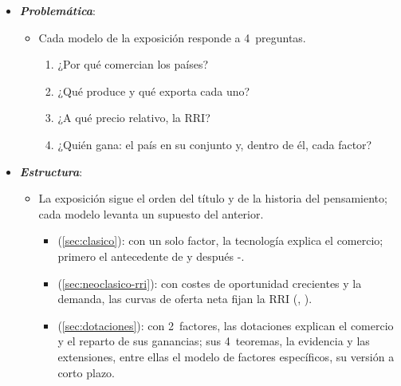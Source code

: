 \documentclass[11pt]{article}
\begin{document}
\begin{itemize}
\item \textbf{\emph{Problemática}}:
  \begin{itemize}
  \item Cada modelo de la exposición responde a 4~preguntas.
  \begin{enumerate}
  \item ¿Por qué comercian los países?
  \item ¿Qué produce y qué exporta cada uno?
  \item ¿A qué precio relativo, la RRI?
  \item ¿Quién gana: el país en su conjunto y, dentro de él, cada factor?
  \end{enumerate}
  \end{itemize}


\item \textbf{\emph{Estructura}}:
  \begin{itemize}
  \item La exposición sigue el orden del título y de la historia del pensamiento; cada modelo levanta un supuesto del anterior.
  \begin{itemize}
  \item {} (\ref{sec:clasico}): con un solo factor, la tecnología explica el comercio; primero el antecedente de  y después -.
  \item {} (\ref{sec:neoclasico-rri}): con costes de oportunidad crecientes y la demanda, las curvas de oferta neta fijan la RRI (, ).
  \item {} (\ref{sec:dotaciones}): con 2~factores, las dotaciones explican el comercio y el reparto de sus ganancias; sus 4~teoremas, la evidencia y las extensiones, entre ellas el modelo de factores específicos, su versión a corto plazo.
  \end{itemize}
  \end{itemize}
\end{itemize}
\end{document}
